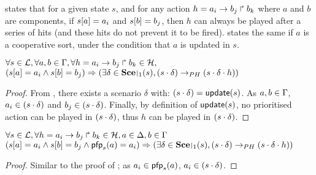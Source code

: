  states that for a given state $s$, and for any action $h = a_i\rightarrow b_j\Rsh b_k$ where $a$ and $b$ are components,
if ${s[a]} = a_i$ and ${s[b]} = b_j$, then
$h$ can always be played after a series of hits (and these hits do not prevent it to be fired).
 states the same if $a$ is a cooperative sort, under the condition that $a$ is updated in $s$.
\begin{theorem}
\label{th:hcompcomp}
  $\forall s \in \mathcal{L}, \forall a,b \in \Gamma, \forall h = a_i\rightarrow b_j\Rsh b_k \in \mathcal{H},$\\
  $(\PHget{s}{a} = a_i \wedge \PHget{s}{b} = b_j) \Rightarrow (\exists \delta \in \restriction{\Sce}{1}(s),
  (s \PHplay \delta) \PHPtrans (s \PHplay \delta \PHplay h))$
\end{theorem}
\begin{proof}
  From , there exists a scenario $\delta$ with: $(s \cdot \delta) = \mathsf{update}(s)$.
  As $a,b \in \Gamma$, $a_i \in (s \cdot \delta)$ and $b_j \in (s \cdot \delta)$.
  Finally, by definition of $\mathsf{update}(s)$, no prioritised action can be played in $(s \cdot \delta)$, thus $h$ can be played in $(s \cdot \delta)$.
\end{proof}
\begin{theorem}
\label{th:hcscomp}
  $\forall s \in \mathcal{L}, \forall h = a_i\rightarrow b_j\Rsh b_k \in \mathcal{H}, a \in \Delta, b \in \Gamma$\\
  $(\PHget{s}{a} = a_i \wedge \PHget{s}{b} = b_j \wedge \pfp_s(a) = a_i) \Rightarrow (\exists \delta \in \restriction{\Sce}{1}(s),
  (s \PHplay \delta) \PHPtrans (s \PHplay \delta \PHplay h))$
\end{theorem}
\begin{proof}
  Similar to the proof of ;
  as $a_i \in \mathsf{pfp}_s(a)$, $a_i \in (s \cdot \delta)$.
\end{proof}

